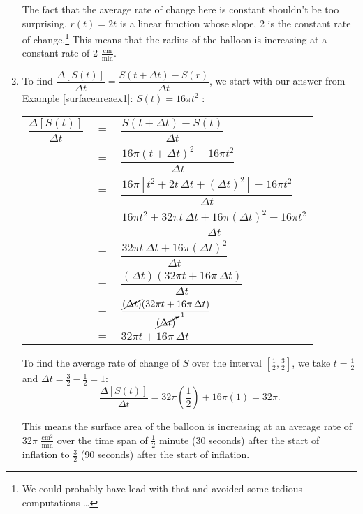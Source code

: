 \begin{ex}
\begin{enumerate}
The fact that the average rate of change here is constant shouldn't be too surprising.  $r(t) = 2t$ is a linear function whose slope, $2$ is the constant rate of change.\footnote{We could probably have lead with that and avoided some tedious computations \ldots}  This means that the radius of the balloon is increasing at a constant rate of $2$ $\frac{\text{cm}}{\text{min}}$.


                         
\item  To find  $\dfrac{\Delta[S(t)]}{\Delta t} = \dfrac{S(t+ \Delta t) - S(r)}{\Delta t}$, we start with our answer from Example \ref{surfaceareaex1}:  $S(t) =  16 \pi t^{2}$ :

\begin{longtable}{rcl}

 $\dfrac{\Delta[S(t)]}{\Delta t}$ & $=$ &$\dfrac{S(t+ \Delta t) - S(t)}{\Delta t}$   \\[10pt]
                         & $=$ & $\dfrac{16 \pi (t+ \Delta t)^2 - 16 \pi t^2}{\Delta t}$ \\[10pt]
                         & $=$ & $\dfrac{16 \pi \left[ t^2 + 2 t \, \Delta t + (\Delta t)^2\right]  - 16 \pi t^2}{\Delta t}$ \\[10pt]
                         & $=$ & $\dfrac{16 \pi t^2 + 32 \pi t \, \Delta t + 16 \pi (\Delta t)^2   - 16 \pi t^2}{\Delta t}$ \\[10pt]
                         & $=$ & $\dfrac{32 \pi t \, \Delta t + 16 \pi (\Delta t)^2}{\Delta t}$ \\[10pt]
                         & $=$ & $\dfrac{(\Delta t) (32 \pi t + 16 \pi \, \Delta t)}{\Delta t}$ \\[10pt]
                         & $=$ & $\dfrac{\cancel{(\Delta t)} (32 \pi t + 16 \pi \, \Delta t)}{\cancelto{1}{(\Delta t)}}$ \\[10pt]
                         & $=$ & $32 \pi t + 16 \pi \, \Delta t$  \\ \end{longtable}
                         
To find the average rate of change of $S$ over the interval $\left[\frac{1}{2}, \frac{3}{2}\right]$, we take $t = \frac{1}{2}$ and $\Delta t = \frac{3}{2} - \frac{1}{2} = 1$: \[\frac{\Delta[S(t)]}{\Delta t} = 32 \pi \left(\frac{1}{2}\right) + 16 \pi (1) = 32 \pi.\]

\medskip

This means the surface area of the balloon  is increasing at an average rate of $32 \pi$ $\frac{\text{cm}^2}{\text{min}}$ over the time span of $\frac{1}{2}$ minute ($30$ seconds) after the start of inflation to $\frac{3}{2}$ ($90$ seconds) after the start of inflation.


\end{enumerate}
\end{ex}
